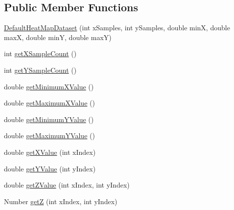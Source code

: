 \subsection*{Public Member Functions}
\begin{DoxyCompactItemize}
\item 
\mbox{\hyperlink{classorg_1_1jfree_1_1data_1_1general_1_1_default_heat_map_dataset_ab52fdcc4a2af1809350c2a34f8b00b8d}{Default\+Heat\+Map\+Dataset}} (int x\+Samples, int y\+Samples, double minX, double maxX, double minY, double maxY)
\item 
int \mbox{\hyperlink{classorg_1_1jfree_1_1data_1_1general_1_1_default_heat_map_dataset_a0dd847578301662deb9a9880a603e7f1}{get\+X\+Sample\+Count}} ()
\item 
int \mbox{\hyperlink{classorg_1_1jfree_1_1data_1_1general_1_1_default_heat_map_dataset_af67f4dae36d4757ab83623dbd3811501}{get\+Y\+Sample\+Count}} ()
\item 
double \mbox{\hyperlink{classorg_1_1jfree_1_1data_1_1general_1_1_default_heat_map_dataset_ab15741ca0fcbd1d8224d228aef4a80b2}{get\+Minimum\+X\+Value}} ()
\item 
double \mbox{\hyperlink{classorg_1_1jfree_1_1data_1_1general_1_1_default_heat_map_dataset_aa3c976aabd54b923d2f01cea7b3a0657}{get\+Maximum\+X\+Value}} ()
\item 
double \mbox{\hyperlink{classorg_1_1jfree_1_1data_1_1general_1_1_default_heat_map_dataset_a668dc2df7c2f9e52f76d076fd1b89cd0}{get\+Minimum\+Y\+Value}} ()
\item 
double \mbox{\hyperlink{classorg_1_1jfree_1_1data_1_1general_1_1_default_heat_map_dataset_a5d18e184f6950c93da573d964e692d5c}{get\+Maximum\+Y\+Value}} ()
\item 
double \mbox{\hyperlink{classorg_1_1jfree_1_1data_1_1general_1_1_default_heat_map_dataset_a812c8041769c20ca2db0dcf5f3622376}{get\+X\+Value}} (int x\+Index)
\item 
double \mbox{\hyperlink{classorg_1_1jfree_1_1data_1_1general_1_1_default_heat_map_dataset_a8fcca5de20effdeea0e7decf94425d6d}{get\+Y\+Value}} (int y\+Index)
\item 
double \mbox{\hyperlink{classorg_1_1jfree_1_1data_1_1general_1_1_default_heat_map_dataset_a93219a73fd817685f8e9ea06ad9d570b}{get\+Z\+Value}} (int x\+Index, int y\+Index)
\item 
Number \mbox{\hyperlink{classorg_1_1jfree_1_1data_1_1general_1_1_default_heat_map_dataset_a8d76ab265c9da8926a9d956f9a3bdc28}{getZ}} (int x\+Index, int y\+Index)
\item 

\end{DoxyCompactItemize}
